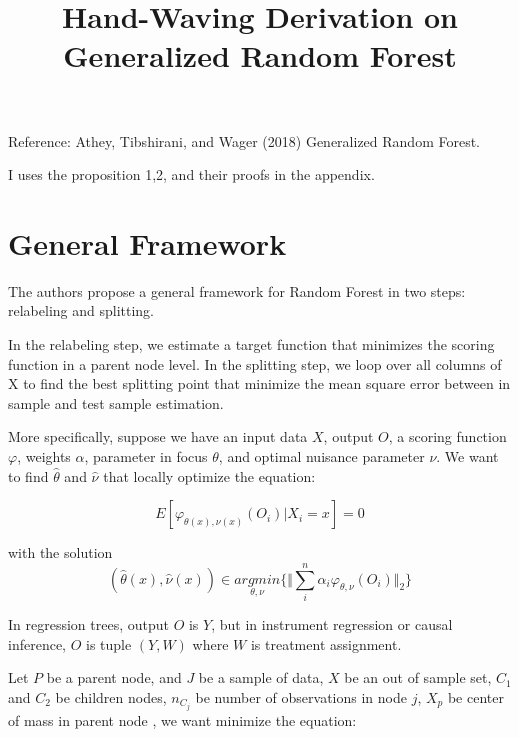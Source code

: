 \documentclass[12pt,letterpaper]{article}
\title{}
\author{}
\begin{document}
\title{Hand-Waving Derivation on Generalized Random Forest}
\maketitle

Reference: Athey, Tibshirani, and Wager (2018) Generalized Random Forest. 

I  uses the proposition 1,2, and their proofs in the appendix. 

\section{General Framework}
The authors propose a general framework for Random Forest in two steps: relabeling and splitting. 

In the relabeling step, we estimate a target function that minimizes the scoring function in a parent node level. In the splitting step, we loop over all columns of X  to find the best splitting point that minimize the mean square error between in sample and test sample estimation. 

More specifically, suppose we have an input data $ X $, output $ O $, a scoring function $\varphi$, weights $ \alpha $, parameter in focus $\theta$, and optimal nuisance parameter $\nu$. We want to find $\hat{\theta}$ and $ \hat{\nu} $ that locally optimize the equation:  

\begin{equation}\label{key}
	E[\varphi_{\theta(x), \nu(x)}(O_{i})|X_{i}=x] = 0
\end{equation}

with the solution 
\begin{equation}
	(\hat{\theta}(x), \hat{\nu}(x)) \in  \underset{\theta, \nu}{argmin} \Big\{ \Vert    \sum_{i}^{n}\alpha_{i}\varphi_{\theta,\nu}(O_{i}) \Vert_{2}  \Big\}
\end{equation}

In regression trees, output $ O $ is $ Y $, but in instrument regression or causal inference, $ O $ is tuple $ (Y, W) $ where $ W $ is treatment assignment.

Let $ P $ be a parent node, and $ J $ be a sample of data, $ X $ be an out of sample set, $ C_{1} $ and $ C_{2} $  be children nodes, $ n_{C_j} $ be number of observations in node $ j $, $ X_p $ be center of mass in parent node , we want minimize the equation:
\end{document}
